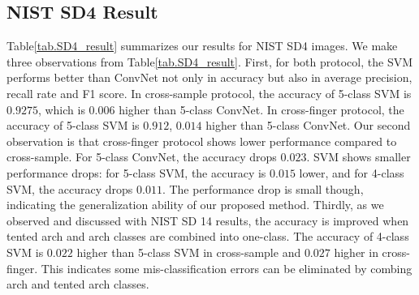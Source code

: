 \subsection{NIST SD4 Result}
\label{sec_sd4}
 Table\ref{tab.SD4_result} summarizes our results for NIST SD4 images.
%
We make three observations from Table\ref{tab.SD4_result}.
%
First, for both protocol, the SVM performs better than ConvNet not only in accuracy but also in average precision, recall rate and F1 score. 
%
In cross-sample protocol, the accuracy of 5-class SVM is $0.9275$, which is $0.006$ higher than 5-class ConvNet. In cross-finger protocol, the accuracy of 5-class SVM is $0.912$, $0.014$ higher than 5-class ConvNet.
%
Our second observation is that cross-finger protocol shows lower performance compared to cross-sample. For 5-class ConvNet, the accuracy drops $0.023$. SVM shows smaller performance drops: for 5-class SVM, the accuracy is $0.015$ lower, and for 4-class SVM, the accuracy drops $0.011$. 
%
%
The performance drop is small though, indicating the generalization ability of our proposed method.
%
Thirdly, as we observed and discussed with NIST SD 14 results, the accuracy is improved when tented arch and arch classes are combined into one-class. The accuracy of 4-class SVM is $0.022$ higher than 5-class SVM in cross-sample and $0.027$ higher in cross-finger. This indicates some mis-classification errors can be eliminated by combing arch and tented arch classes.

